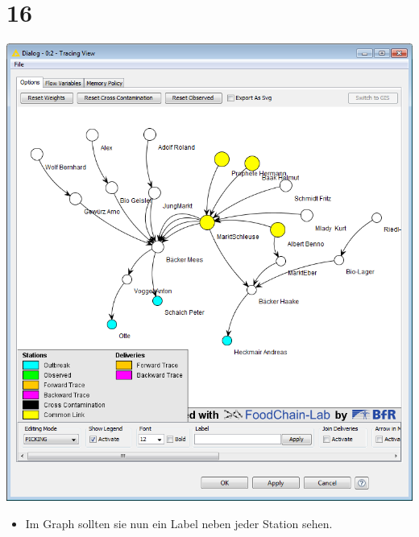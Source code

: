 \documentclass{beamer}
\begin{document}
\section{16}
\begin{frame}
	\begin{center}
  		\includegraphics[height=0.6\textheight]{16.png}
	\end{center}
	\begin{itemize}
		\item Im Graph sollten sie nun ein Label neben jeder Station sehen.
	\end{itemize}
\end{frame}
\end{document}
